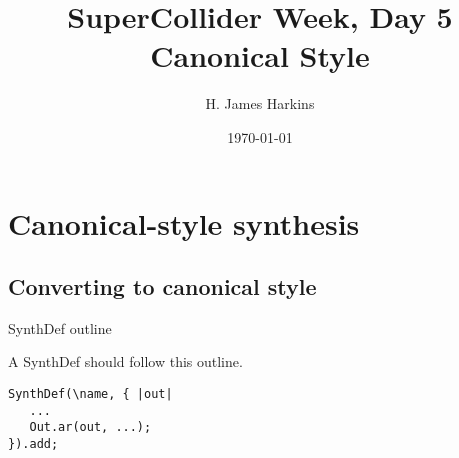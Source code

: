 \documentclass[ignorenonframetext,presentation]{beamer}
\author{H. James Harkins}
\date{\today}
\title{SuperCollider Week, Day 5 \\ Canonical Style}
\begin{document}
\section{Canonical-style synthesis}
\label{sec-1}
\subsection{Converting to canonical style}
\label{sec-1-1}
\begin{frame}[fragile,label=sec-1-2-2]{SynthDef outline}
 \begin{block}{A SynthDef should follow this outline.}
\begin{lstlisting}
SynthDef(\name, { |out|
   ...
   Out.ar(out, ...);
}).add;
\end{lstlisting}
\end{block}
\end{frame}
\end{document}
